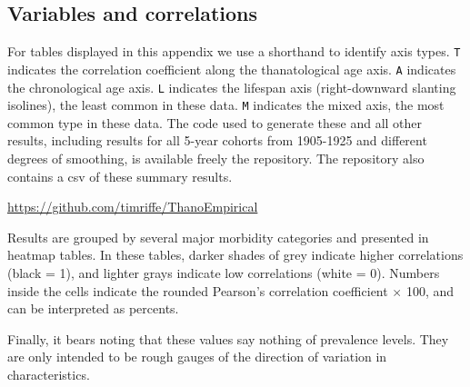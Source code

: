 \documentclass[11pt,oneside]{article} %
\begin{document}
\singlespacing

   
%  

%
\begin{appendices}
\section{Variables and correlations}

\end{appendices}

For tables displayed in this appendix we use a shorthand to identify axis types.
\texttt{T} indicates the correlation coefficient along the thanatological age axis.
\texttt{A} indicates the chronological age axis. \texttt{L} indicates the lifespan axis
(right-downward slanting isolines), the least common in these data. \texttt{M}
indicates the mixed axis, the most common type in these data. The code used to generate these and all other
results, including results for all 5-year cohorts from 1905-1925 and different
degrees of smoothing, is available freely the repository. The repository
also contains a csv of these summary results.

\url{https://github.com/timriffe/ThanoEmpirical}

Results are grouped by several major morbidity categories and presented in
heatmap tables. In these tables, darker shades of grey indicate higher
correlations (black = 1), and lighter grays indicate low correlations
(white = 0). Numbers inside the cells indicate the rounded Pearson's correlation
coefficient $\times$ 100, and can be interpreted as percents. 

Finally, it bears noting that these values say nothing of prevalence levels.
They are only intended to be rough gauges of the direction of variation in characteristics.

\listoftables
\end{document}
